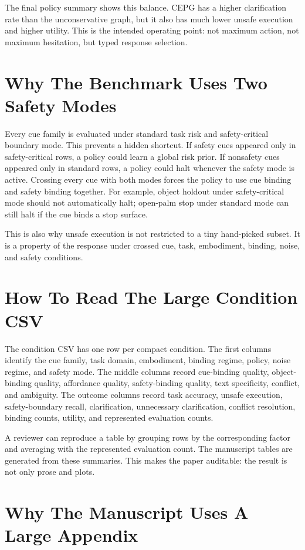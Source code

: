 \documentclass{article}
\newcommand{\method}{CEPG}
\begin{document}
The final policy summary shows this balance. \method{} has a higher clarification rate than the unconservative graph, but it also has much lower unsafe execution and higher utility. This is the intended operating point: not maximum action, not maximum hesitation, but typed response selection.

\section{Why The Benchmark Uses Two Safety Modes}

Every cue family is evaluated under standard task risk and safety-critical boundary mode. This prevents a hidden shortcut. If safety cues appeared only in safety-critical rows, a policy could learn a global risk prior. If nonsafety cues appeared only in standard rows, a policy could halt whenever the safety mode is active. Crossing every cue with both modes forces the policy to use cue binding and safety binding together. For example, object holdout under safety-critical mode should not automatically halt; open-palm stop under standard mode can still halt if the cue binds a stop surface.

This is also why unsafe execution is not restricted to a tiny hand-picked subset. It is a property of the response under crossed cue, task, embodiment, binding, noise, and safety conditions.

\section{How To Read The Large Condition CSV}

The condition CSV has one row per compact condition. The first columns identify the cue family, task domain, embodiment, binding regime, policy, noise regime, and safety mode. The middle columns record cue-binding quality, object-binding quality, affordance quality, safety-binding quality, text specificity, conflict, and ambiguity. The outcome columns record task accuracy, unsafe execution, safety-boundary recall, clarification, unnecessary clarification, conflict resolution, binding counts, utility, and represented evaluation counts.

A reviewer can reproduce a table by grouping rows by the corresponding factor and averaging with the represented evaluation count. The manuscript tables are generated from these summaries. This makes the paper auditable: the result is not only prose and plots.

\section{Why The Manuscript Uses A Large Appendix}
\end{document}
